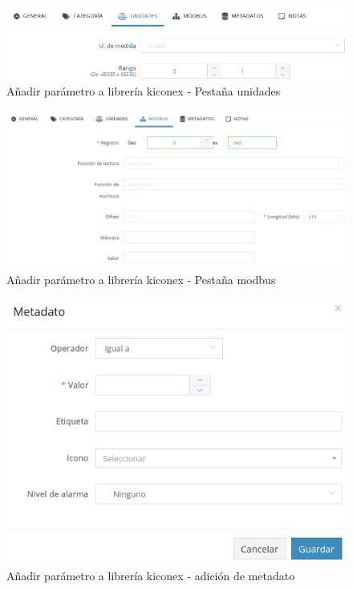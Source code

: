 \begin{figure}[H]
  \centering
  \includegraphics[width=\textwidth, keepaspectratio]{img/lib2}
  \caption{Añadir parámetro a librería kiconex - Pestaña unidades}
  \label{figura:lib2}
\end{figure}

\begin{figure}[H]
  \centering
  \includegraphics[width=\textwidth, keepaspectratio]{img/lib3}
  \caption{Añadir parámetro a librería kiconex - Pestaña modbus}
  \label{figura:lib3}
\end{figure}

\begin{figure}[H]
  \centering
  \includegraphics[width=12cm, keepaspectratio]{img/lib4}
  \caption{Añadir parámetro a librería kiconex - adición de metadato}
  \label{figura:lib4}
\end{figure}

